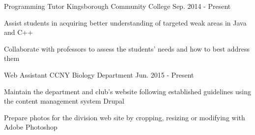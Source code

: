 \begin{cventries}

\iftrue
  \cventry
    {Programming Tutor} %
    {Kingsborough Community College} %
	{Sep. 2014 - Present} %
    {} %
    {
      \begin{cvitems} %
        \item {Assist students in acquiring better understanding of targeted weak areas in Java and C++}
        \item {Collaborate with professors to assess the students’ needs and how to best address them}
      \end{cvitems}
    }
\fi

\iftrue
  \cventry
    {Web Assistant} %
    {CCNY Biology Department} %
	{Jun. 2015 - Present} %
    {} %
    {
      \begin{cvitems} %
        \item {Maintain the department and club's website following
			established guidelines using the content management system Drupal}
        \item {Prepare photos for the division web site by cropping,
		  resizing or modifying with Adobe Photoshop}
      \end{cvitems}
    }
\fi


\end{cventries}
